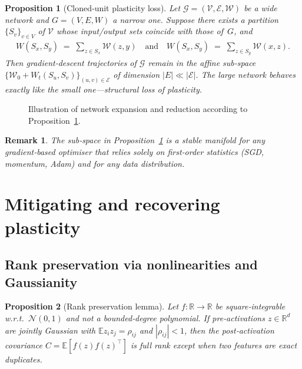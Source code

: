 \documentclass{article}
\newcommand{\R}{\mathbb{R}}
\newcommand{\E}{\mathbb{E}}
\newtheorem{proposition}{Proposition}[section]
\newtheorem{remark}{Remark}[section]
\begin{document}
\begin{proposition}[Cloned‑unit plasticity loss]
\label{prop:cloned}
Let $\mathcal{G}=(\mathcal{V},\mathcal{E},\mathcal{W})$ be a wide network and $G=(V,E,W)$ a narrow one.  
Suppose there exists a partition $\{S_v\}_{v\in V}$ of $\mathcal{V}$ whose input/output sets coincide with those of~$G$, and
\begin{align}
W(S_x,S_y) \;=\; \sum_{z\in S_x}\mathcal{W}(z,y) \quad\text{and}\quad
W(S_x,S_y) \;=\; \sum_{z\in S_y}\mathcal{W}(x,z).
\end{align}
Then gradient‑descent trajectories of $\mathcal{G}$ remain in the affine sub‑space
\(
\{\mathcal{W}_0+W_t(S_u,S_v)\}_{(u,v)\in\mathcal{E}}
\)
of dimension $|E|\ll|\mathcal{E}|$.  The large network behaves exactly like the small one—\emph{structural} loss of plasticity.
\end{proposition}


\begin{figure}[t]
    \centering
    \resizebox{\textwidth}{!}{}
    \caption{Illustration of network expansion and reduction according to Proposition~\ref{prop:cloned}.}
    \label{fig:plasticity-manifolds}
\end{figure}


\begin{remark}
The sub‑space in Proposition~\ref{prop:cloned} is a stable manifold for any gradient‑based optimiser that relies solely on first‑order statistics (SGD, momentum, Adam) and for any data distribution.
\end{remark}

\section{Mitigating and recovering plasticity}
\label{sec:mitigate}

\subsection{Rank preservation via nonlinearities and Gaussianity}

\begin{proposition}[Rank preservation lemma]
\label{prop:rank}
Let $f:\R\to\R$ be square‑integrable w.r.t.\ $\mathcal{N}(0,1)$ and not a bounded‑degree polynomial.  
If pre‑activations $z\in\R^d$ are jointly Gaussian with $\E z_i z_j=\rho_{ij}$ and $|\rho_{ij}|<1$, then the post‑activation covariance $C=\E[f(z)f(z)^\top]$ is full rank except when two features are exact duplicates.
\end{proposition}
\end{document}
